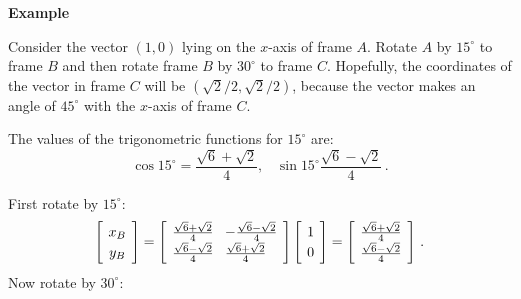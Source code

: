 \documentclass[11pt,a4paper]{report}
\newcommand*{\spacearray}{
\renewcommand{\arraystretch}{1.2}
\setlength{\arraycolsep}{4pt}
}
\begin{document}

\textbf{Example}

Consider the vector $(1,0)$ lying on the $x$-axis of frame $A$. Rotate $A$ by $15^\circ$ to frame $B$ and then rotate frame $B$ by $30^\circ$ to frame $C$. Hopefully, the coordinates of the vector in frame $C$ will be $(\sqrt{2}/2,\sqrt{2}/2)$, because the vector makes an angle of $45^\circ$ with the $x$-axis of frame $C$.

The values of the trigonometric functions for $15^\circ$ are:
\[\cos 15^\circ = \frac{\sqrt{6}+\sqrt{2}}{4},\;\;\; \sin 15^\circ\frac{\sqrt{6}-\sqrt{2}}{4}\,.
\]

First rotate by $15^\circ$:
\begin{displaymath}
\spacearray
\left[ 
\begin{array}{c} x_B\\ y_B \end{array}
\right] = 
\left[
\begin{array}{l} \frac{\sqrt{6}+\sqrt{2}}{4} \\ \frac{\sqrt{6}-\sqrt{2}}{4} \end{array}\\
\begin{array}{l} -\frac{\sqrt{6}-\sqrt{2}}{4} \\ \frac{\sqrt{6}+\sqrt{2}}{4} \end{array}\\
\right]
\left[\begin{array}{l} 1 \\ 0 \end{array}\\ \right] =
\left[
\begin{array}{l} \frac{\sqrt{6}+\sqrt{2}}{4} \\ \frac{\sqrt{6}-\sqrt{2}}{4} \end{array}\\
\right]\,.
\end{displaymath}
Now rotate by $30^\circ$:
\end{document}
